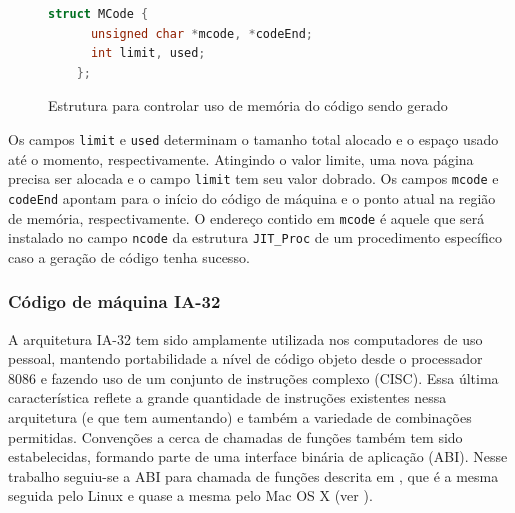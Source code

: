 \begin{figure}[h]
  \centering
  \begin{lstlisting}[language=C]
    struct MCode {
      unsigned char *mcode, *codeEnd;
      int limit, used;
    };
  \end{lstlisting}
  \caption{Estrutura para controlar uso de memória do código sendo gerado\label{mcode-struct}}
\end{figure}

Os campos \verb!limit! e \verb!used! determinam o tamanho total
alocado e o espaço usado até o momento, respectivamente. Atingindo o
valor limite, uma nova página precisa ser alocada e o campo
\verb!limit! tem seu valor dobrado. Os campos \verb!mcode! e
\verb!codeEnd! apontam para o início do código de máquina e o
ponto atual na região de memória, respectivamente. O endereço contido em
\verb!mcode! é aquele que será instalado no campo
\verb!ncode! da estrutura \verb!JIT_Proc! de um procedimento
específico caso a geração de código tenha sucesso.

\subsubsection{Código de máquina IA-32}

A arquitetura IA-32 tem sido amplamente utilizada nos computadores de
uso pessoal, mantendo portabilidade a nível de código objeto desde o
processador 8086 e fazendo uso de um conjunto de instruções complexo (CISC).
Essa última característica reflete a grande quantidade de instruções
existentes nessa arquitetura (e que tem aumentando) e também a
variedade de combinações permitidas. Convenções a cerca de chamadas de
funções também tem sido estabelecidas, formando parte de uma interface
binária de aplicação (ABI). Nesse trabalho seguiu-se a ABI para
chamada de funções descrita em , que é a mesma
seguida pelo Linux e quase a mesma pelo Mac OS X (ver ).


